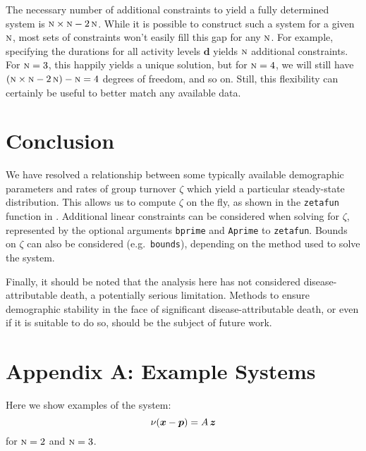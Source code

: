 \documentclass{article}
\newcommand{\N}{\textsc{n}}
\begin{document}
The necessary number of additional constraints to yield
a fully determined system is $\N\times\N - 2\thinspace\N$.
While it is possible to construct such a system for a given $\N$,
most sets of constraints won't easily fill this gap for any $\N$.
For example, specifying the durations for all activity levels $\bm{d}$
yields $\N$ additional constraints.
For $\N = 3$, this happily yields a unique solution,
but for $\N = 4$, we will still have $(\N\times\N - 2\thinspace\N) - \N = 4$ degrees of freedom,
and so on.
Still, this flexibility can certainly be useful to better match any available data.
\section{Conclusion}
We have resolved a relationship between some typically available demographic parameters
and rates of group turnover $\zeta$ which yield a particular steady-state distribution.
This allows us to compute $\zeta$ on the fly,
as shown in the \texttt{zetafun} function in .
Additional linear constraints can be considered when solving for $\zeta$,
represented by the optional arguments \texttt{bprime} and \texttt{Aprime} to \texttt{zetafun}.
Bounds on $\zeta$ can also be considered (e.g.\ \texttt{bounds}),
depending on the method used to solve the system.
\par
Finally, it should be noted that the analysis here has not considered
disease-attributable death,
a potentially serious limitation.
Methods to ensure demographic stability in the face of significant disease-attributable death,
or even if it is suitable to do so,
should be the subject of future work.
\clearpage\section*{Appendix A: Example Systems}\label{ap:eg-sys}
Here we show examples of the system:
\begin{equation}
\nu (\bm{x} - \bm{p}) = A \thinspace \bm{z}
\end{equation}
for $\N = 2$ and $\N = 3$.
\end{document}
